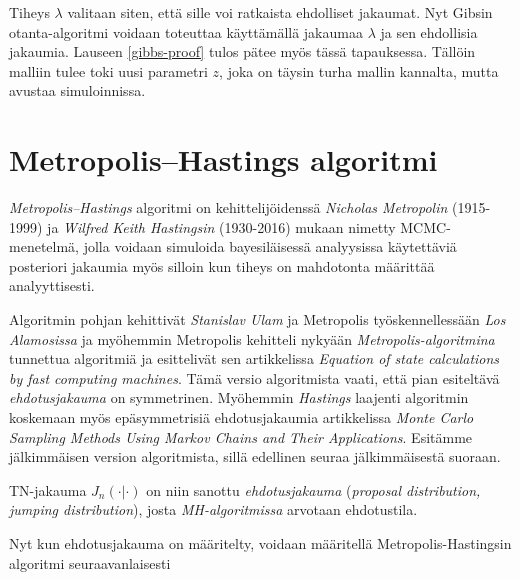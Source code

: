 Tiheys $\lambda$ valitaan siten, että sille voi ratkaista ehdolliset jakaumat. Nyt Gibsin otanta-algoritmi voidaan toteuttaa käyttämällä jakaumaa $\lambda$ ja sen ehdollisia jakaumia. Lauseen \ref{gibbs-proof} tulos pätee myös tässä tapauksessa. Tällöin malliin tulee toki uusi parametri $z$, joka on täysin turha mallin kannalta, mutta avustaa simuloinnissa.



\section{Metropolis--Hastings algoritmi}\label{Metropolis--Hastings algoritmi}

\textit{Metropolis--Hastings} algoritmi on kehittelijöidenssä \textit{Nicholas Metropolin} (1915-1999) ja \textit{Wilfred Keith Hastingsin} (1930-2016) mukaan nimetty MCMC-menetelmä, jolla voidaan simuloida bayesiläisessä analyysissa käytettäviä posteriori jakaumia myös silloin kun tiheys on mahdotonta määrittää analyyttisesti.

Algoritmin pohjan kehittivät \textit{Stanislav Ulam} ja Metropolis työskennellessään \textit{Los Alamosissa} ja myöhemmin Metropolis kehitteli nykyään \textit{Metropolis-algoritmina} tunnettua algoritmiä ja esittelivät sen artikkelissa \textit{Equation of state calculations by fast computing machines}\cite{metropolis_nicholas_equation_1953}. Tämä versio algoritmista vaati, että pian esiteltävä \textit{ehdotusjakauma} on symmetrinen. Myöhemmin \textit{Hastings} laajenti algoritmin koskemaan myös epäsymmetrisiä ehdotusjakaumia artikkelissa \textit{Monte Carlo Sampling Methods Using Markov Chains and Their Applications}. Esitämme jälkimmäisen version algoritmista, sillä edellinen seuraa jälkimmäisestä suoraan.

\begin{merk}
	TN-jakauma $J_n(\cdot|\cdot)$ on niin sanottu \textit{ehdotusjakauma} (\textit{proposal distribution, jumping distribution}), josta \textit{MH-algoritmissa} arvotaan ehdotustila.
\end{merk}

Nyt kun ehdotusjakauma on määritelty, voidaan määritellä Metropolis-Hastingsin algoritmi seuraavanlaisesti \cite[s.278-279]{gelman_andrew_bayesian_nodate}


